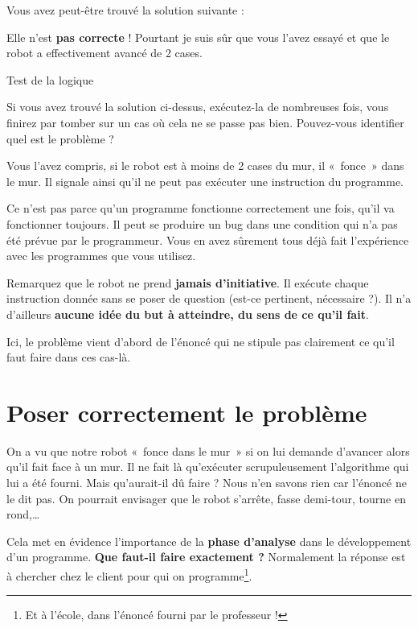 	Vous avez peut-être trouvé la solution suivante :

	
	Elle n'est \textbf{pas correcte} ! Pourtant je suis sûr
	que vous l'avez essayé et que le robot a effectivement
	avancé de 2 cases. 

	\begin{Emphase}{Test de la logique}

		Si vous avez trouvé la solution ci-dessus, exécutez-la de nombreuses
		fois, vous finirez par tomber sur un cas où cela ne se passe pas bien.
		Pouvez-vous identifier quel est le problème ?

	\end{Emphase}

	Vous l'avez compris, si le robot est à moins de 2 cases
	du mur, il «~fonce~» dans le mur. Il signale ainsi
	qu'il ne peut pas exécuter une instruction du
	programme.
	
	Ce n'est pas parce qu'un programme
	fonctionne correctement une fois, qu'il va fonctionner
	toujours. Il peut se produire un bug dans une condition qui
	n'a pas été prévue par le programmeur. Vous en avez
	sûrement tous déjà fait l'expérience avec les
	programmes que vous utilisez.

	Remarquez que le robot ne prend \textbf{jamais
	d'initiative}. Il exécute chaque instruction donnée
	sans se poser de question (est-ce pertinent, nécessaire ?). Il
	n'a d'ailleurs \textbf{aucune idée du
	but à atteindre, du sens de ce qu'il fait}.
	
	Ici, le problème vient d'abord de
	l'énoncé qui ne stipule pas clairement ce
	qu'il faut faire dans ces cas-là.

\section{Poser correctement le problème}

	On a vu que notre robot «~fonce dans le mur~» si on lui demande
	d'avancer alors qu'il fait face à un
	mur. Il ne fait là qu'exécuter scrupuleusement
	l'algorithme qui lui a été fourni. Mais
	qu'aurait-il dû faire ? Nous n'en
	savons rien car l'énoncé ne le dit pas. On pourrait
	envisager que le robot s'arrête, fasse demi-tour,
	tourne en rond,\dots
	
	Cela met en évidence l'importance de la \textbf{phase
	d'analyse} dans le développement d'un
	programme. \textbf{Que faut-il faire exactement ?} Normalement la
	réponse est à chercher chez le client pour qui on programme\footnote{Et
	à l'école, dans l'énoncé fourni par
	le professeur ! }.
	
